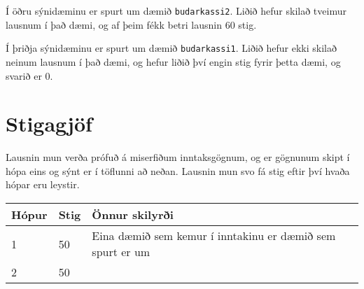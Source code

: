 Í öðru sýnidæminu er spurt um dæmið \texttt{budarkassi2}. Liðið hefur skilað
tveimur lausnum í það dæmi, og af þeim fékk betri lausnin $60$ stig.

Í þriðja sýnidæminu er spurt um dæmið \texttt{budarkassi1}. Liðið hefur ekki
skilað neinum lausnum í það dæmi, og hefur liðið því engin stig fyrir þetta
dæmi, og svarið er $0$.

\section*{Stigagjöf}
Lausnin mun verða prófuð á miserfiðum inntaksgögnum, og er gögnunum skipt í
hópa eins og sýnt er í töflunni að neðan. Lausnin mun svo fá stig eftir því
hvaða hópar eru leystir.

\begin{tabular}{|l|l|l|l|}
\hline
Hópur & Stig & Önnur skilyrði \\ \hline
1     & 50      & Eina dæmið sem kemur í inntakinu er dæmið sem spurt er um \\ \hline
2     & 50      &  \\ \hline
\end{tabular}
